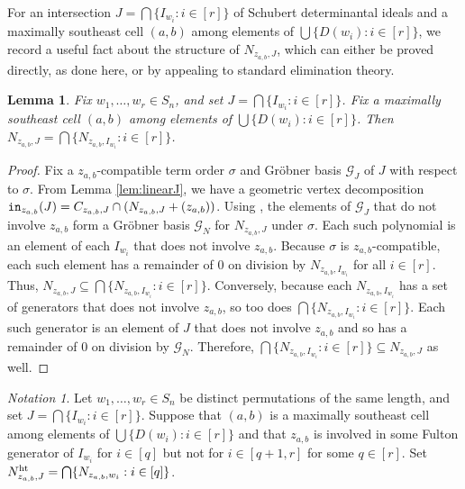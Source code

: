 \documentclass[12pt,reqno]{amsart}
\newtheorem{lemma}[theorem]{Lemma}
\newtheorem{Main Conjecture}[theorem]{Main Conjecture}
\theoremstyle{remark}
\newtheorem{notation}[theorem]{Notation}
\theoremstyle{plain}
\newcommand{\init}{{\tt in}}
\begin{document}
For an intersection $J = \bigcap \{I_{w_i}: i \in [r]\}$ of Schubert determinantal ideals and a maximally southeast cell $(a,b)$ among elements of $\bigcup \{D(w_i):i\in[r]\}$, we record a useful fact about the structure of $N_{z_{a,b},J}$, which can either be proved directly, as done here, or by appealing to standard elimination theory.
\begin{lemma}\label{lem:intersectNs}
Fix $w_1, \ldots, w_r \in S_n$, and set 
$J= \bigcap \{I_{w_i} : i \in [r]\}$.
Fix a maximally southeast cell $(a,b)$ among elements of $\bigcup \{D(w_i):i\in[r]\}$.
Then $N_{z_{a,b},J} = \bigcap\{N_{{z_{a,b}},I_{w_i}}: i \in [r]\}$.
\end{lemma}
\begin{proof} Fix a $z_{a,b}$-compatible term order $\sigma$ and Gr\"obner basis $\mathcal{G}_{J}$ of $J$ with respect to $\sigma$.  From Lemma \ref{lem:linearJ}, we have a geometric vertex decomposition $\init_{z_{a,b}}(J) = C_{z_{a,b},J} \cap (N_{z_{a,b},J}+(z_{a,b}))$. Using \cite[Theorem 2.1(a)]{KMY09}, the elements of $\mathcal{G}_J$ that do not involve $z_{a,b}$ form  a Gr\"obner basis $\mathcal{G}_{N}$ for $N_{z_{a,b},J}$ under $\sigma$.  Each such polynomial is an element of each $I_{w_i}$ that does not involve $z_{a,b}$.  Because $\sigma$ is $z_{a,b}$-compatible, each such element has a remainder of $0$ on division by $N_{z_{a,b},I_{w_i}}$ for all $i \in [r]$.  Thus,
$N_{z_{a,b},J} \subseteq  \bigcap\{ N_{z_{a,b},I_{w_i}}:i \in [r]\}$.
Conversely, because each $N_{z_{a,b},I_{w_i}}$ has a set of generators that does not involve $z_{a,b}$, so too does 
$ \bigcap\{ N_{z_{a,b},I_{w_i}}:i \in [r]\}$.
Each such generator is an element of $J$ that does not involve $z_{a,b}$ and so has a remainder of $0$ on division by $\mathcal{G}_{N}$.  Therefore, 
$ \bigcap\{N_{z_{a,b},I_{w_i}} :i \in [r]\}\subseteq  N_{z_{a,b},J} $ 
as well.
\end{proof}

\begin{notation}\label{not:htN}
Let $w_1, \ldots, w_r \in S_n$ be distinct permutations of the same length, and set 
$J= \bigcap \{I_{w_i}: i \in [r]\}$.
Suppose that $(a,b)$ is a maximally southeast cell among elements of 
$\bigcup \{D(w_i):i\in[r]\}$
and that $z_{a,b}$ is involved in some Fulton generator of $I_{w_i}$ for $i \in [q]$ but not for $i \in [q+1,r]$ for some $q \in [r]$.  
Set $N_{z_{a,b},J}^{\rm ht} =  \bigcap \{N_{{z_{a,b}},w_i}: i \in [q] \}$.  
\end{notation}
\end{document}
